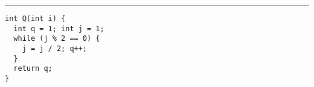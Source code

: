 \documentclass{article}
\begin{document}
\lstset{language = C,
    extendedchars = \true,
    keepspaces = true,
    breaklines=true,
    frame=lines}
\hrule
\begin{lstlisting}[title=\textbf {Алгоритм 1.2} Построение бинарного кода Грея]
int Q(int i) {
  int q = 1; int j = 1;
  while (j % 2 == 0) {
    j = j / 2; q++;
  }
  return q;
}

\end{lstlisting}
\end{document}

